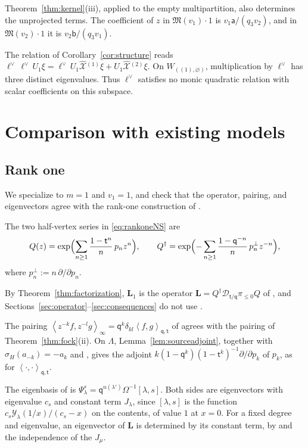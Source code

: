 \documentclass[11pt]{amsart}
\theoremstyle{definition}
\theoremstyle{remark}
\newcommand{\Mq}{\mathsf q}                      %
\newcommand{\Mt}{\mathsf t}                      %
\newcommand{\La}{\Lambda}                        %
\newcommand{\CY}{\mathcal Y}
\newcommand{\Yfn}[1]{\CY_{#1}}                   %
\newcommand{\ip}[2]{\left\langle #1,#2\right\rangle}
\newcommand{\ipinf}[2]{\left\langle #1,#2\right\rangle_\infty}   %
\newcommand{\ceig}[1]{c_{#1}}                    %
\newcommand{\Wfib}[1]{W_{#1}}                    %
\newcommand{\pt}[2]{[#1,#2]}                     %
\newcommand{\taut}{\ell}                         %
\newcommand{\dtaut}{\taut^{\vee}}                %
\newcommand{\Omap}{\Omega}                       %
\newcommand{\sigH}{\sigma_H}                     %
\newcommand{\LL}{\mathbf L}
\newcommand{\Lax}[1]{\LL_{#1}}                   %
\newcommand{\DD}{\mathcal D}
\newcommand{\Twist}[1]{\DD_{#1}}                 %
\newcommand{\pile}{\pi_{\leq0}}                  %
\newcommand{\Xhat}[1]{\widehat{\mathcal X}{}^{(#1)}}   %
\newcommand{\Miuraop}{\mathfrak M}               %
\newcommand{\Qcr}{Q}                             %
\newcommand{\Qan}{Q^\dagger}                     %
\newcommand{\PsiNS}[2]{\Psi_{#1}^{#2}}           %
\begin{document}
Theorem~\ref{thm:kernel}(iii), applied to the empty multipartition, also
determines the unprojected terms. The coefficient of \(z\) in
\(\Miuraop(v_1)\cdot1\) is \(v_1\mathsf a/(q_3v_2)\), and in
\(\Miuraop(v_2)\cdot1\) it is \(v_2\mathsf b/(q_3v_1)\).

The relation of Corollary~\ref{cor:structure} reads
\(\dtaut\,\dtaut\,U_1\xi=\dtaut\,U_1\Xhat{1}\xi+U_1\Xhat{2}\xi\).
On \(\Wfib{((1),\varnothing)}\), multiplication by \(\dtaut\) has three distinct eigenvalues.
Thus \(\dtaut\) satisfies no monic quadratic relation with
scalar coefficients on this subspace.

\section{Comparison with existing models}\label{sec:comparison}

\subsection{Rank one}\label{sec:rankone}

We specialize to \(m=1\) and \(v_1=1\), and check that the operator, pairing, and
eigenvectors agree with the rank-one construction of \cite{M26}.

The two half-vertex series in \eqref{eq:rankoneNS} are
\[
 \Qcr(z)=\exp\Bigl(\sum_{n\geq1}\frac{1-\Mt^n}{n}\,p_nz^n\Bigr),\qquad
 \Qan=\exp\Bigl(-\sum_{n\geq1}\frac{1-\Mq^{-n}}{n}\,p_n^\perp z^{-n}\Bigr),
\]
where \(p_n^\perp:=n\,\partial/\partial p_n\).

By Theorem~\ref{thm:factorization}, \(\Lax{1}\) is the operator
\(\LL=\Qan\Twist{\Mt/\Mq}\pile\Qcr\) of \cite[Definition~3.1]{M26}, and Sections~\ref{sec:operator}--\ref{sec:consequences}
do not use \cite{M26}.

The pairing \(\ipinf{z^{-k}f}{z^{-l}g}=\Mq^k\delta_{kl}\ip{f}{g}_{\Mq,\Mt}\)
of \cite[(7)]{M26} agrees with the pairing of Theorem~\ref{thm:fock}(ii).
On \(\La\), Lemma~\ref{lem:sourceadjoint}, together with
\(\sigH(a_{-k})=-a_k\) and \cite[(2.33)]{BCS}, gives the adjoint
\(k(1-\Mq^k)(1-\Mt^k)^{-1}\partial/\partial p_k\) of \(p_k\),
as for \(\ip{\cdot}{\cdot}_{\Mq,\Mt}\).

The eigenbasis of
\cite[Proposition~3.11]{M26} is \(\PsiNS{\lambda}{s}=\Mq^{n(\lambda')}\Omap^{-1}\pt{\lambda}{s}\). Both sides are eigenvectors
with eigenvalue \(\ceig{s}\) and constant term \(J_\lambda\), since \(\pt{\lambda}{s}\) is the function
\(\ceig{s}\Yfn{\lambda}(1/x)/(\ceig{s}-x)\) on the contents, of value \(1\) at \(x=0\).
For a fixed degree and eigenvalue, an eigenvector of \(\LL\) is determined by
its constant term, by \cite[Proposition~3.11]{M26} and the independence of the \(J_\mu\).
\end{document}
